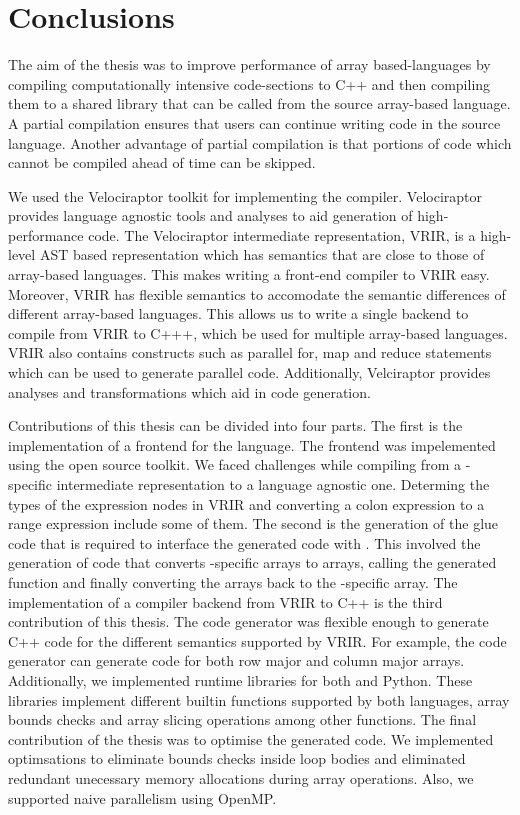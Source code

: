 \section{Conclusions}
The aim of the thesis was to improve performance of array based-languages by compiling computationally intensive code-sections to C++ and then compiling them to a shared library that can be called from the source array-based language. A partial compilation ensures that users can continue writing code in the source language. Another advantage of partial compilation is that portions of code which cannot be compiled ahead of time can be skipped. 

We used the Velociraptor toolkit for implementing the compiler. Velociraptor provides language agnostic tools and analyses to aid generation of high-performance code. The Velociraptor intermediate representation, VRIR, is a high-level AST based representation which has semantics that are close to those of array-based languages. This makes writing a front-end compiler to VRIR easy. Moreover, VRIR has flexible semantics to accomodate the semantic differences of different array-based languages. This allows us to write a single backend to compile from VRIR to C+++, which be used for multiple array-based languages. VRIR also contains constructs such as parallel for, map and reduce statements which can be used to generate parallel code. Additionally, Velciraptor provides analyses and transformations which aid in code generation. 

Contributions of this thesis can be divided into four parts. The first is the implementation of a frontend for the \matlab language. The frontend was impelemented using the open source \mclab toolkit. We faced challenges while compiling from a \matlab-specific intermediate representation to a language agnostic one. Determing the types of the expression nodes in VRIR and converting a colon expression to a range expression include some of them. The second is the generation of the glue code that is required to interface the generated code with \matlab. This involved the generation of code that converts \matlab-specific arrays to \velocty arrays, calling the generated function and finally converting the \velocty arrays back to the \matlab-specific array. The implementation of a compiler backend from VRIR to C++ is the third contribution of this thesis. The code generator was flexible enough to generate C++ code for the different semantics supported by VRIR. For example, the code generator can generate code for both row major and column major arrays. Additionally, we implemented runtime libraries for both \matlab and Python. These libraries implement different builtin functions supported by both languages, array bounds checks and array slicing operations among other functions. The final contribution of the thesis was to optimise the generated code. We implemented optimsations to eliminate bounds checks inside loop bodies and eliminated redundant unecessary memory allocations during array operations. Also, we supported naive parallelism using OpenMP.  

